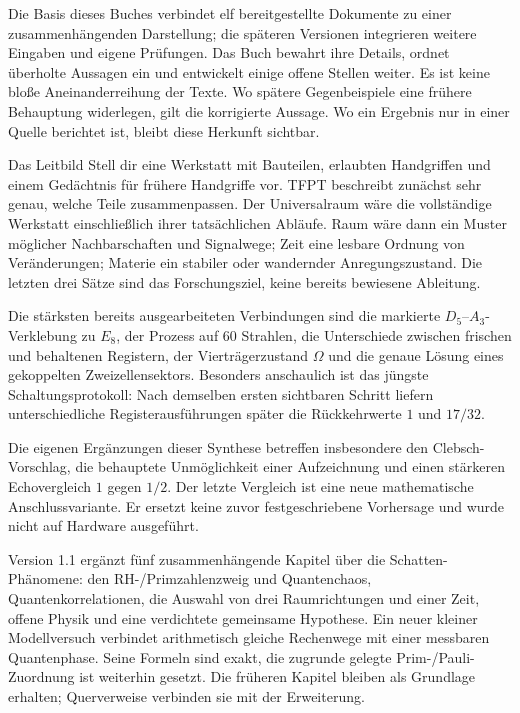 \documentclass[11pt,a4paper,oneside,parskip=half,headings=normal]{scrreprt}
\begin{document}
Die Basis dieses Buches verbindet elf bereitgestellte Dokumente zu einer zusammenhängenden Darstellung; die späteren Versionen integrieren weitere Eingaben und eigene Prüfungen. Das Buch bewahrt ihre Details, ordnet überholte Aussagen ein und entwickelt einige offene Stellen weiter. Es ist keine bloße Aneinanderreihung der Texte. Wo spätere Gegenbeispiele eine frühere Behauptung widerlegen, gilt die korrigierte Aussage. Wo ein Ergebnis nur in einer Quelle berichtet ist, bleibt diese Herkunft sichtbar.

\begin{bild}{Das Leitbild}
Stell dir eine Werkstatt mit Bauteilen, erlaubten Handgriffen und einem Gedächtnis für frühere Handgriffe vor. TFPT beschreibt zunächst sehr genau, welche Teile zusammenpassen. Der Universalraum wäre die vollständige Werkstatt einschließlich ihrer tatsächlichen Abläufe. Raum wäre dann ein Muster möglicher Nachbarschaften und Signalwege; Zeit eine lesbare Ordnung von Veränderungen; Materie ein stabiler oder wandernder Anregungszustand. Die letzten drei Sätze sind das Forschungsziel, keine bereits bewiesene Ableitung.
\end{bild}

Die stärksten bereits ausgearbeiteten Verbindungen sind die markierte $D_5$--$A_3$-Verklebung zu $E_8$, der Prozess auf 60 Strahlen, die Unterschiede zwischen frischen und behaltenen Registern, der Vierträgerzustand $\Omega$ und die genaue Lösung eines gekoppelten Zweizellensektors. Besonders anschaulich ist das jüngste Schaltungsprotokoll: Nach demselben ersten sichtbaren Schritt liefern unterschiedliche Registerausführungen später die Rückkehrwerte $1$ und $17/32$.

Die eigenen Ergänzungen dieser Synthese betreffen insbesondere den Clebsch-Vorschlag, die behauptete Unmöglichkeit einer Aufzeichnung und einen stärkeren Echovergleich $1$ gegen $1/2$. Der letzte Vergleich ist eine neue mathematische Anschlussvariante. Er ersetzt keine zuvor festgeschriebene Vorhersage und wurde nicht auf Hardware ausgeführt.

Version 1.1 ergänzt fünf zusammenhängende Kapitel über die Schatten-Phänomene: den RH-/Primzahlenzweig und Quantenchaos, Quantenkorrelationen, die Auswahl von drei Raumrichtungen und einer Zeit, offene Physik und eine verdichtete gemeinsame Hypothese. Ein neuer kleiner Modellversuch verbindet arithmetisch gleiche Rechenwege mit einer messbaren Quantenphase. Seine Formeln sind exakt, die zugrunde gelegte Prim-/Pauli-Zuordnung ist weiterhin gesetzt. Die früheren Kapitel bleiben als Grundlage erhalten; Querverweise verbinden sie mit der Erweiterung.
\end{document}
